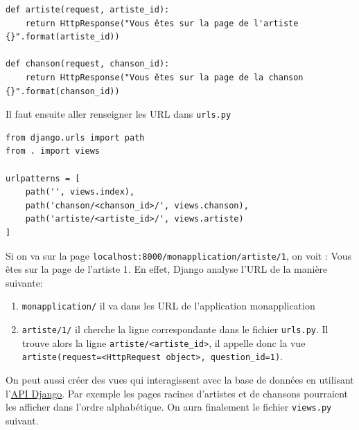 \documentclass[a4paper, 10pt]{article}
\begin{document}
\begin{verbatim}
def artiste(request, artiste_id):
    return HttpResponse("Vous êtes sur la page de l'artiste {}".format(artiste_id))

def chanson(request, chanson_id):
    return HttpResponse("Vous êtes sur la page de la chanson {}".format(chanson_id))
\end{verbatim}

Il faut ensuite aller renseigner les URL dans \texttt{urls.py}
\begin{verbatim}
from django.urls import path
from . import views

urlpatterns = [
    path('', views.index),
    path('chanson/<chanson_id>/', views.chanson),
    path('artiste/<artiste_id>/', views.artiste)
]
\end{verbatim}

Si on va sur la page \texttt{localhost:8000/monapplication/artiste/1}, on voit : \og Vous êtes sur la page de l'artiste 1\fg{}. En effet, Django analyse l'URL de la manière suivante:
\begin{enumerate}
    \item \texttt{monapplication/} il va dans les URL de l’application monapplication
    \item \texttt{artiste/1/} il cherche la ligne correspondante dans le fichier \texttt{urls.py}. Il trouve alors la ligne \texttt{artiste/<artiste_id>}, il appelle donc la vue \texttt{artiste(request=<HttpRequest object>, question_id=1)}.
\end{enumerate}

On peut aussi créer des vues qui interagissent avec la base de données en utilisant l'\href{https://docs.djangoproject.com/fr/2.0/topics/db/queries/}{API Django}. Par exemple les pages racines d'artistes et de chansons pourraient les afficher dans l'ordre alphabétique. On aura finalement le fichier \texttt{views.py} suivant.
\end{document}
